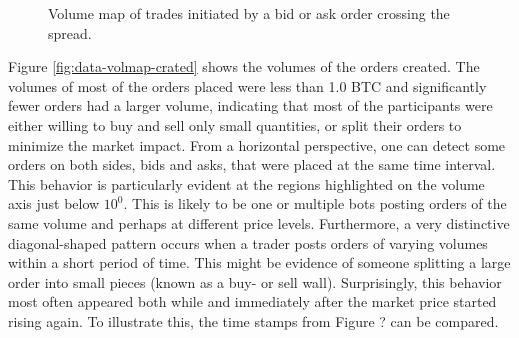 \begin{figure}[H]
    \centering
    \caption{Volume map of trades initiated by a bid or ask order crossing the spread.}
    \label{fig:data-volmap-traded}
\end{figure}
Figure \ref{fig:data-volmap-crated} shows the volumes of the orders created.
The volumes of most of the orders placed were less than 1.0 BTC and significantly fewer orders had a larger volume, indicating that most of the participants were either willing to buy and sell only small quantities, or split their orders to minimize the market impact.
From a horizontal perspective, one can detect some orders on both sides, bids and asks, that were placed at the same time interval.
This behavior is particularly evident at the regions highlighted on the volume axis just below $10^0$.
This is likely to be one or multiple bots posting orders of the same volume and perhaps at different price levels.
Furthermore, a very distinctive diagonal-shaped pattern occurs when a trader posts orders of varying volumes within a short period of time.
This might be evidence of someone splitting a large order into small pieces (known as a buy- or sell wall).
Surprisingly, this behavior most often appeared both while and immediately after the market price started rising again. To illustrate this, the time stamps from Figure ? can be compared.

